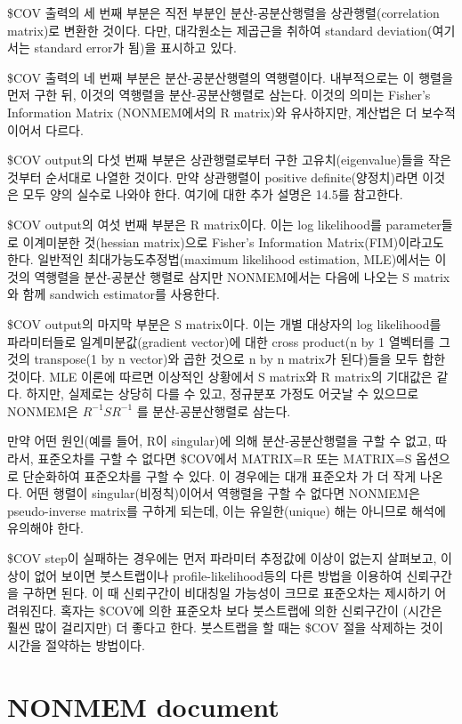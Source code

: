 \documentclass[
  10pt,
]{krantz}
\begin{document}
\$COV 출력의 세 번째 부분은 직전 부분인 분산-공분산행렬을 상관행렬(correlation matrix)로 변환한 것이다.
다만, 대각원소는 제곱근을 취하여 standard deviation(여기서는 standard error가 됨)을 표시하고
있다.

\$COV 출력의 네 번째 부분은 분산-공분산행렬의 역행렬이다. 내부적으로는 이 행렬을 먼저 구한 뒤, 이것의 역행렬을
분산-공분산행렬로 삼는다. 이것의 의미는 Fisher's Information Matrix
(NONMEM에서의 R matrix)와 유사하지만, 계산법은 더 보수적이어서 다르다.

\$COV output의 다섯 번째 부분은 상관행렬로부터 구한 고유치(eigenvalue)들을 작은 것부터 순서대로 나열한 것이다.
만약 상관행렬이 positive definite(양정치)라면 이것은 모두 양의 실수로 나와야 한다. 여기에 대한 추가 설명은
14.5를 참고한다.

\$COV output의 여섯 번째 부분은 R matrix이다. 이는 log likelihood를 parameter들로 이계미분한
것(hessian matrix)으로 Fisher's Information Matrix(FIM)이라고도 한다. 일반적인
최대가능도추정법(maximum likelihood estimation, MLE)에서는 이것의 역행렬을
분산-공분산 행렬로 삼지만 NONMEM에서는 다음에 나오는 S matrix와 함께 sandwich
estimator를 사용한다.

\$COV output의 마지막 부분은 S matrix이다. 이는 개별 대상자의 log likelihood를 파라미터들로
일계미분값(gradient vector)에 대한 cross product(n by 1 열벡터를 그것의
transpose(1 by n vector)와 곱한 것으로 n by n matrix가 된다)들을 모두 합한 것이다. MLE 이론에
따르면 이상적인 상황에서 S matrix와 R matrix의 기대값은 같다. 하지만, 실제로는 상당히 다를 수 있고, 정규분포
가정도 어긋날 수 있으므로 NONMEM은 \(R^{- 1}SR^{- 1}\) 를 분산-공분산행렬로 삼는다.

만약 어떤 원인(예를 들어, R이 singular)에 의해 분산-공분산행렬을 구할 수 없고, 따라서, 표준오차를 구할 수 없다면
\$COV에서 MATRIX=R 또는 MATRIX=S 옵션으로 단순화하여 표준오차를 구할 수 있다. 이 경우에는 대개 표준오차 가 더
작게 나온다. 어떤 행렬이 singular(비정칙)이어서 역행렬을 구할 수 없다면 NONMEM은 pseudo-inverse
matrix를 구하게 되는데, 이는 유일한(unique) 해는 아니므로 해석에 유의해야 한다.

\$COV step이 실패하는 경우에는 먼저 파라미터 추정값에 이상이 없는지 살펴보고, 이상이 없어 보이면 붓스트랩이나
profile-likelihood등의 다른 방법을 이용하여 신뢰구간을 구하면 된다. 이 때 신뢰구간이 비대칭일 가능성이 크므로
표준오차는 제시하기 어려워진다. 혹자는 \$COV에 의한 표준오차 보다 붓스트랩에 의한 신뢰구간이 (시간은 훨씬 많이
걸리지만) 더 좋다고 한다. 붓스트랩을 할 때는 \$COV 절을 삭제하는 것이 시간을 절약하는 방법이다.

\hypertarget{nonmem-document}{%
\section{NONMEM document}\label{nonmem-document}}
\end{document}
